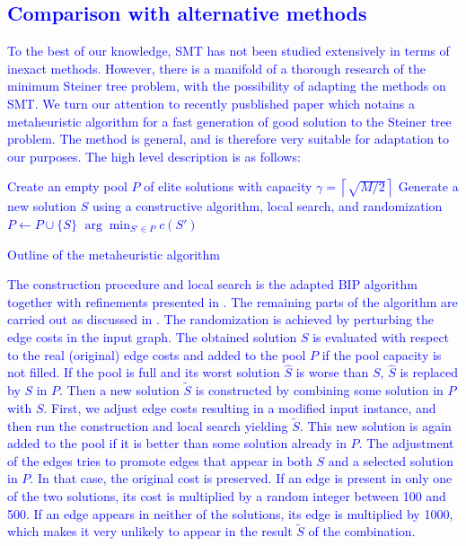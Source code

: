 \textcolor{blue}{\subsection{Comparison with alternative methods}}

\textcolor{blue}{
To the best of our knowledge, SMT has not been studied extensively in terms of inexact methods.
However, there is a manifold of a thorough research of the minimum Steiner tree problem, with the possibility of adapting the methods on SMT.
We turn our attention to recently pusblished paper \citet{pajor18} which notains a metaheuristic algorithm for a fast generation of good solution to the Steiner tree problem.
The method is general, and is therefore very suitable for adaptation to our purposes.
The high level description is as follows:}
\begin{algorithm}
\textcolor{blue}{
Create an empty pool $P$ of elite solutions with capacity $\gamma=\left\lceil\sqrt{M/2}\right\rceil$\;
 {
Generate a new solution $S$ using a constructive algorithm, local search, and randomization\;
 {$P\leftarrow P\cup \{S\}$}
}
\Return $\arg\min_{S'\in P} c(S')$\;
 \caption{Outline of the metaheuristic algorithm}
}
\label{alg:meta}
\end{algorithm}
\textcolor{blue}{The construction procedure and local search is the adapted BIP algorithm together with refinements presented in \citet{ivanova16isco}.
The remaining parts of the algorithm are carried out as discussed in \citet{pajor18}.
The randomization is achieved by perturbing the edge costs in the input graph.
The obtained solution $S$ is evaluated with respect to the real (original) edge costs and added to the pool $P$ if the pool capacity is not filled.
If the pool is full and its worst solution $\hat{S}$ is worse than $S$, $\hat{S}$ is replaced by $S$ in $P$.
Then a new solution $\tilde{S}$ is constructed by combining some solution in $P$ with $S$. 
First, we adjust edge costs resulting in a modified input instance, 
and then run the construction and local search yielding $\tilde{S}$.
This new solution is again added to the pool if it is better than some solution already in $P$.
The adjustment of the edges tries to promote edges that appear in both $S$ and a selected solution in $P$. 
In that case, the original cost is preserved.
If an edge is present in only one of the two solutions, its cost is multiplied by a random integer between 100 and 500.
If an edge appears in neither of the solutions, its edge is multiplied by 1000, which makes it very unlikely to appear in the result $\tilde{S}$ of the combination.
}
